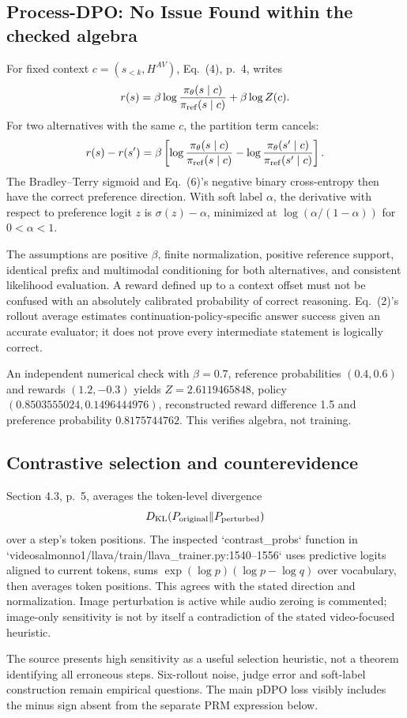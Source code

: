\documentclass[10pt]{article}
\begin{document}
\subsection*{Process-DPO: No Issue Found within the checked algebra}
For fixed context \(c=(s_{<k},H^{AV})\), Eq. (4), p. 4, writes \[r(s)=\beta\log\frac{\pi_\theta(s\mid c)}{\pi_{\rm ref}(s\mid c)}
       +\beta\log Z(c).\] For two alternatives with the same \(c\), the partition term cancels: \[r(s)-r(s')=\beta\left[
 \log\frac{\pi_\theta(s\mid c)}{\pi_{\rm ref}(s\mid c)}
-\log\frac{\pi_\theta(s'\mid c)}{\pi_{\rm ref}(s'\mid c)}
 \right].\] The Bradley–Terry sigmoid and Eq. (6)’s negative binary cross-entropy then have the correct preference direction. With soft label \(\alpha\), the derivative with respect to preference logit \(z\) is \(\sigma(z)-\alpha\), minimized at \(\log(\alpha/(1-\alpha))\) for \(0<\alpha<1\).\par
The assumptions are positive \(\beta\), finite normalization, positive reference support, identical prefix and multimodal conditioning for both alternatives, and consistent likelihood evaluation. A reward defined up to a context offset must not be confused with an absolutely calibrated probability of correct reasoning. Eq. (2)’s rollout average estimates continuation-policy-specific answer success given an accurate evaluator; it does not prove every intermediate statement is logically correct.\par
An independent numerical check with \(\beta=0.7\), reference probabilities \((0.4,0.6)\) and rewards \((1.2,-0.3)\) yields \(Z=2.6119465848\), policy \((0.8503555024,0.1496444976)\), reconstructed reward difference 1.5 and preference probability \(0.8175744762\). This verifies algebra, not training.\par
\subsection*{Contrastive selection and counterevidence}
Section 4.3, p. 5, averages the token-level divergence \[D_{\rm KL}(P_{\rm original}\|P_{\rm perturbed})\] over a step’s token positions. The inspected `contrast\_probs` function in `videosalmonno1/llava/train/llava\_trainer.py:1540--1556` uses predictive logits aligned to current tokens, sums \(\exp(\log p)(\log p-\log q)\) over vocabulary, then averages token positions. This agrees with the stated direction and normalization. Image perturbation is active while audio zeroing is commented; image-only sensitivity is not by itself a contradiction of the stated video-focused heuristic.\par
The source presents high sensitivity as a useful selection heuristic, not a theorem identifying all erroneous steps. Six-rollout noise, judge error and soft-label construction remain empirical questions. The main pDPO loss visibly includes the minus sign absent from the separate PRM expression below.\par
\end{document}
